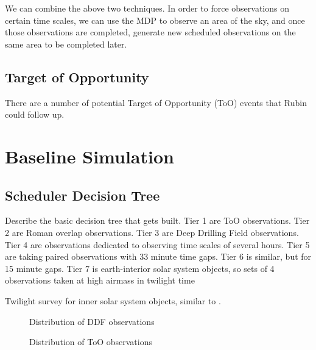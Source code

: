 \documentclass[]{aastex631}
\begin{document}
We can combine the above two techniques. In order to force observations on certain time scales, we can use the MDP to observe an area of the sky, and once those observations are completed, generate new scheduled observations on the same area to be completed later. 

\subsection{Target of Opportunity}

There are a number of potential Target of Opportunity (ToO) events that Rubin could follow up. 


\section{Baseline Simulation}


\subsection{Scheduler Decision Tree}
Describe the basic decision tree that gets built. Tier 1 are ToO observations. Tier 2 are Roman overlap observations. Tier 3 are Deep Drilling Field observations. Tier 4 are observations dedicated to observing time scales of several hours. Tier 5 are taking paired observations with 33 minute time gaps. Tier 6 is similar, but for 15 minute gaps. Tier 7 is earth-interior solar system objects, so sets of 4 observations taken at high airmass in twilight time 






Twilight survey for inner solar system objects, similar to \citet{Ye2020}.



\begin{figure}
\caption{Distribution of DDF observations \label{fig:tiers_ddf}}
\end{figure}


\begin{figure}
\caption{Distribution of ToO observations \label{fig:tiers_ddf}}
\end{figure}
\end{document}
